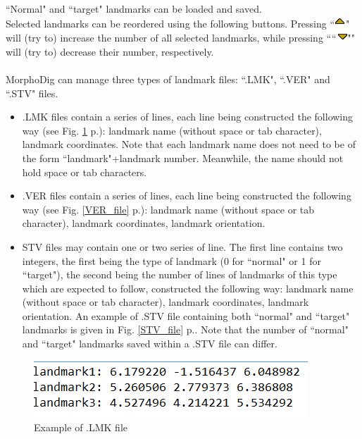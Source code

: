  ``Normal" and ``target" landmarks can be loaded and saved.\\
Selected landmarks can be reordered using the following buttons. Pressing ``\includegraphics[scale=0.7]{images/06/objects/move_up.png}"
will (try to) increase the number of all selected landmarks, while pressing ````\includegraphics[scale=0.7]{images/06/objects/move_down.png}""
will (try to) decrease their number, respectively.\\\\
MorphoDig can manage three types of landmark files: ``.LMK", ``.VER" and ``.STV" files.
\begin{itemize}
\item 
 .LMK files contain a series of lines, each line
being constructed the following way (see Fig. \ref{LMK_file} p.\pageref{LMK_file}): landmark
name (without space or tab character),
landmark coordinates. Note that each landmark name does not need to be of the form ``landmark"+landmark number. Meanwhile, the name should not hold space or tab
characters.
\item .VER files contain a series
of lines, each line being
constructed the following
way (see Fig. \ref{VER_file} p.\pageref{VER_file}): landmark name (without space or tab character), landmark coordinates, landmark orientation.
\item STV files may contain one or two series of line. The first line contains two integers, the first being the type of landmark (0 for ``normal" or 1 for ``target"), the second being the number of lines of landmarks of this type which are expected to follow, constructed the following way: landmark name (without space or tab character), landmark coordinates, landmark orientation. An example of .STV file containing both ``normal" and ``target" landmarks is given in Fig. \ref{STV_file} p.\pageref{STV_file}. Note that the number of ``normal" and ``target" landmarks saved within a .STV file can differ.
\end{itemize}
\begin{figure}
  \centering
  \includegraphics[scale=0.5]{images/07/landmarks/LMK_file.png}
 \caption{Example of .LMK file}
\label{LMK_file}
\end{figure}

